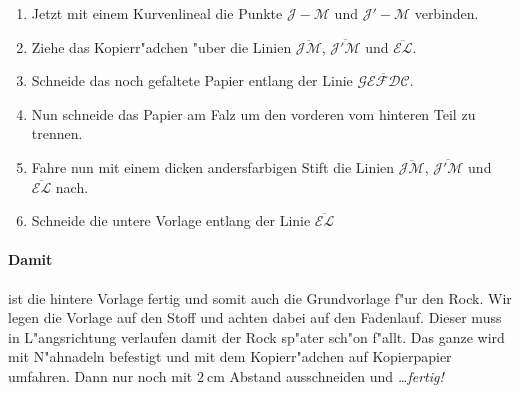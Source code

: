 \documentclass{scrartcl}
\begin{document}
\begin{enumerate}
  \item Jetzt mit einem Kurvenlineal die Punkte $\mathcal{J-M}$ und
    $\mathcal{J'-M}$ verbinden.

  \item Ziehe das Kopierr"adchen "uber die Linien $\overline{\mathcal{JM}}$,
    $\overline{\mathcal{J'M}}$ und $\overline{\mathcal{EL}}$.

  \item Schneide das noch gefaltete Papier entlang der Linie
    $\overline{\mathcal{GEFDC}}$. 

  \item Nun schneide das Papier am Falz um den vorderen vom hinteren Teil zu
    trennen. 

  \item Fahre nun mit einem dicken andersfarbigen Stift die Linien
    $\overline{\mathcal{JM}}$, $\overline{\mathcal{J'M}}$ und
    $\overline{\mathcal{EL}}$ nach.

  \item Schneide die untere Vorlage entlang der Linie
    $\overline{\mathcal{EL}}$

\end{enumerate}

\paragraph{Damit} ist die hintere Vorlage fertig und somit auch die Grundvorlage
f"ur den Rock. Wir legen die Vorlage auf den Stoff und achten dabei auf den
Fadenlauf. Dieser muss in L"angsrichtung verlaufen damit der Rock sp"ater sch"on
f"allt.
Das ganze wird mit N"ahnadeln befestigt und mit dem Kopierr"adchen auf
Kopierpapier umfahren. Dann nur noch mit $\SI{2}{\centi\meter}$ Abstand
ausschneiden und \emph{\dots fertig!}
\end{document}
